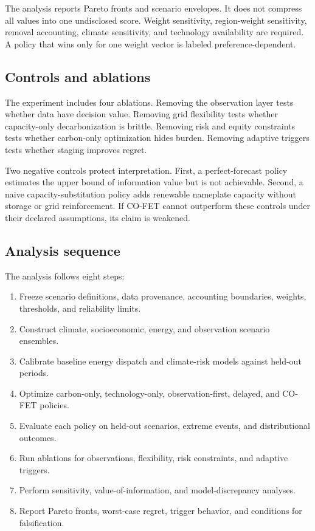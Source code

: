 \documentclass[conference]{IEEEtran}
\begin{document}
The analysis reports Pareto fronts and scenario envelopes. It does not compress all values into one undisclosed score. Weight sensitivity, region-weight sensitivity, removal accounting, climate sensitivity, and technology availability are required. A policy that wins only for one weight vector is labeled preference-dependent.

\subsection{Controls and ablations}
The experiment includes four ablations. Removing the observation layer tests whether data have decision value. Removing grid flexibility tests whether capacity-only decarbonization is brittle. Removing risk and equity constraints tests whether carbon-only optimization hides burden. Removing adaptive triggers tests whether staging improves regret.

Two negative controls protect interpretation. First, a perfect-forecast policy estimates the upper bound of information value but is not achievable. Second, a naive capacity-substitution policy adds renewable nameplate capacity without storage or grid reinforcement. If CO-FET cannot outperform these controls under their declared assumptions, its claim is weakened.

\subsection{Analysis sequence}
The analysis follows eight steps:
\begin{enumerate}
\item Freeze scenario definitions, data provenance, accounting boundaries, weights, thresholds, and reliability limits.
\item Construct climate, socioeconomic, energy, and observation scenario ensembles.
\item Calibrate baseline energy dispatch and climate-risk models against held-out periods.
\item Optimize carbon-only, technology-only, observation-first, delayed, and CO-FET policies.
\item Evaluate each policy on held-out scenarios, extreme events, and distributional outcomes.
\item Run ablations for observations, flexibility, risk constraints, and adaptive triggers.
\item Perform sensitivity, value-of-information, and model-discrepancy analyses.
\item Report Pareto fronts, worst-case regret, trigger behavior, and conditions for falsification.
\end{enumerate}
\end{document}
